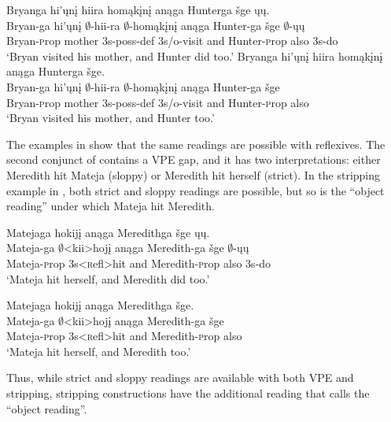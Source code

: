 \documentclass[output=paper]{LSP/langsci}
\begin{document}
\ea\label{ex:johnson:44}
\ea\label{ex:johnson:44a} 
\glll Bryanga hi'ųnį hiira homąkįnį anąga Hunterga šge ųų.\\
Bryan-ga hi'ųnį $\emptyset$-hii-ra $\emptyset$-homąkįnį anąga Hunter-ga šge $\emptyset$-ųų\\
Bryan-{\textsc prop} mother {\textsc 3s-poss-def} {\textsc 3s/o}-visit and Hunter-{\textsc prop} also {\textsc 3s}-do\\
\trans `Bryan visited his mother, and Hunter did too.'
\ex\label{ex:johnson:44b}
\glll Bryanga hi'ųnį hiira homąkįnį anąga Hunterga šge.\\
Bryan-ga hi'ųnį $\emptyset$-hii-ra $\emptyset$-homąkįnį anąga Hunter-ga šge\\
Bryan-{\textsc prop} mother {\textsc 3s-poss-def} {\textsc 3s/o}-visit and Hunter-{\textsc prop} also\\
\trans `Bryan visited his mother, and Hunter too.'
\z
\z

The examples in  show that the same readings are possible with reflexives. The second conjunct of  contains a VPE gap, and it has two interpretations: either Meredith hit Mateja (sloppy) or Meredith hit herself (strict). In the stripping example in , both strict and sloppy readings are possible, but so is the ``object reading'' under which Mateja hit Meredith.
 
\ea\label{ex:johnson:45}
\ea\label{ex:johnson:45a} 
\glll Matejaga hokijį anąga Meredithga šge ųų.\\
Mateja-ga $\emptyset$<kii>hojį anąga Meredith-ga šge $\emptyset$-ųų\\
Mateja-{\textsc prop} {\textsc 3s}<{\textsc refl}>hit and Meredith-{\textsc prop} also {\textsc 3s}-do\\
\trans `Mateja hit herself, and Meredith did too.'

\ex\label{ex:johnson:45b}
\glll Matejaga hokijį anąga Meredithga šge.\\
Mateja-ga $\emptyset$<kii>hojį anąga Meredith-ga šge\\ 
Mateja-{\textsc prop} {\textsc 3s}<{\textsc refl}>hit and Meredith-{\textsc prop} also\\ 
\trans `Mateja hit herself, and Meredith too.'
\z
\z

Thus, while strict and sloppy readings are available with both VPE and stripping, stripping constructions have the additional reading that \citealt{Fortin2007} calls the ``object reading''.
\end{document}
